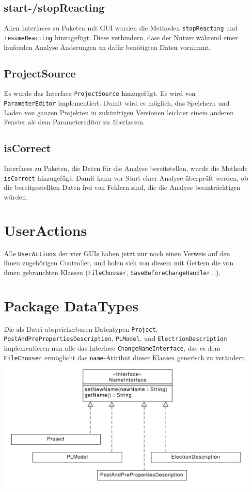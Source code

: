 \documentclass[a4paper]{scrreprt}
\begin{document}
\subsection{start-/stopReacting}
Allen Interfaces zu Paketen mit GUI wurden die Methoden \verb!stopReacting! und \\ \verb!resumeReacting! hinzugefügt. Diese verhindern, dass der Nutzer während einer laufenden Analyse Änderungen an dafür benötigten Daten vornimmt. \\

\subsection{ProjectSource}
Es wurde das Interface \verb!ProjectSource! hinzugefügt. Es wird von \verb!ParameterEditor! implementiert. Damit wird es möglich, das Speichern und Laden von ganzen Projekten in zukünftigen Versionen leichter einem anderen Fenster als dem Parametereditor zu überlassen. \\
\subsection{isCorrect}
Interfaces zu Paketen, die Daten für die Analyse bereitstellen, wurde die Methode \verb!isCorrect! hinzugefügt. Damit kann vor Start einer Analyse überprüft werden, ob die bereitgestellten Daten frei von Fehlern sind, die die Analyse beeinträchtigen würden.

\section{UserActions}
Alle \verb!UserActions! der vier GUIs haben jetzt nur noch einen Verweis auf den ihnen zugehörigen Controller, und holen sich von diesem mit Gettern die von ihnen gebrauchten Klassen (\verb!FileChooser!, \verb!SaveBeforeChangeHandler!...).

\section{Package DataTypes}
Die als Datei abspeicherbaren Datentypen \verb!Project!, \verb!PostAndPrePropertiesDescription!, \verb!PLModel!, und \verb!ElectrionDescription! implementieren nun alle das Interface \verb!ChangeNameInterface!, das es dem \verb!FileChooser! ermöglicht das \verb!name!-Attribut dieser Klassen generisch zu verändern.\\
\includegraphics[scale=0.5]{NameInterface.pdf}
\end{document}
